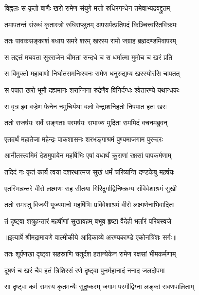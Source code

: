 \twolineshloka
{विह्वलः स कृतो बाणैः खरो रामेण संयुगे}
{मत्तो रुधिरगन्धेन तमेवाभ्यद्रवद्द्रुतम्} %

\twolineshloka
{तमापतन्तं संरब्धं कृतास्त्रो रुधिराप्लुतम्}
{अपसर्पत्प्रतिपदं किञ्चित्त्वरितविक्रमः} %

\twolineshloka
{ततः पावकसङ्काशं बधाय समरे शरम्}
{खरस्य रामो जग्राह ब्रह्मदण्डमिवापरम्} %

\twolineshloka
{स तद्दत्तं मघवता सुरराजेन धीमता}
{सन्दधे च स धर्मात्मा मुमोच च खरं प्रति} %

\twolineshloka
{स विमुक्तो महाबाणो निर्घातसमनिःस्वनः}
{रामेण धनुरुद्यम्य खरस्योरसि चापतत्} %

\twolineshloka
{स पपात खरो भूमौ दह्यमानः शराग्निना}
{रुद्रेणैव विनिर्दग्धः श्वेतारण्ये यथान्धकः} %

\twolineshloka
{स वृत्र इव वज्रेण फेनेन नमुचिर्यथा}
{बलो वेन्द्राशनिहतो निपपात हतः खरः} %

\twolineshloka
{ततो राजर्षयः सर्वे सङ्गताः परमर्षयः}
{सभाज्य मुदिता राममिदं वचनमब्रुवन्} %

\twolineshloka
{एतदर्थं महातेजा महेन्द्रः पाकशासनः}
{शरभङ्गाश्रमं पुण्यमाजगाम पुरन्दरः} %

\twolineshloka
{आनीतस्त्वमिमं देशमुपायेन महर्षिभिः}
{एषां वधार्थं क्रूराणां रक्षसां पापकर्मणाम्} %

\twolineshloka
{तदिदं नः कृतं कार्यं त्वया दशरथात्मज}
{सुखं धर्मं चरिष्यन्ति दण्डकेषु महर्षयः} %

\twolineshloka
{एतस्मिन्नन्तरे वीरो लक्ष्मणः सह सीतया}
{गिरिदुर्गाद्विनिष्क्रम्य संविवेशाश्रमं सुखी} %

\twolineshloka
{ततो रामस्तु विजयी पूज्यमानो महर्षिभिः}
{प्रविवेशाश्रमं वीरो लक्ष्मणेनाभिवादितः} %

\twolineshloka
{तं दृष्ट्वा शत्रुहन्तारं महर्षीणां सुखावहम्}
{बभूव हृष्टा वैदेही भर्तारं परिषस्वजे} %


{॥इत्यार्षे श्रीमद्रामायणे वाल्मीकीये आदिकाव्ये अरण्यकाण्डे एकोनत्रिंशः सर्गः॥}


\twolineshloka
{ततः शूर्पणखा दृष्ट्वा सहस्राणि चतुर्दश}
{हतान्येकेन रामेण रक्षसां भीमकर्मणाम्} %

\twolineshloka
{दूषणं च खरं चैव हतं त्रिशिरसं रणे}
{दृष्ट्वा पुनर्महानादं ननाद जलदोपमा} %

\twolineshloka
{सा दृष्ट्वा कर्म रामस्य कृतमन्यैः सुदुष्करम्}
{जगाम परमौद्विग्ना लङ्कां रावणपालिताम्} %

